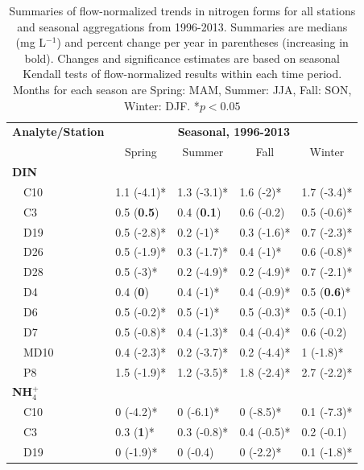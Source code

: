 \documentclass[letterpaper,12pt,oneside]{article}\usepackage[]{graphicx}\usepackage[]{color}
\begin{document}
\begin{table}[!tbp]
\caption{Summaries of flow-normalized trends in nitrogen forms for all stations and seasonal aggregations from 1996-2013. Summaries are  medians (mg L$^{-1}$) and percent change per year in parentheses (increasing in bold). Changes and significance estimates are based on seasonal Kendall tests of flow-normalized results within each time period. Months for each season are Spring: MAM, Summer: JJA, Fall: SON, Winter: DJF. *$p<0.05$\label{tab:trndsaft}} 
\begin{center}
\begin{tabular}{lllll}
\hline\hline
\multicolumn{1}{l}{\bfseries Analyte/Station}&\multicolumn{4}{c}{\bfseries Seasonal, 1996-2013}\tabularnewline
\cline{2-5}
\multicolumn{1}{l}{}&\multicolumn{1}{c}{Spring}&\multicolumn{1}{c}{Summer}&\multicolumn{1}{c}{Fall}&\multicolumn{1}{c}{Winter}\tabularnewline
\hline
{\bfseries DIN}&&&&\tabularnewline
~~C10&1.1 \footnotesize{(-4.1)*}&1.3 \footnotesize{(-3.1)*}&1.6 \footnotesize{(-2)*}&1.7 \footnotesize{(-3.4)*}\tabularnewline
~~C3&0.5 \footnotesize{(\textbf{0.5})}&0.4 \footnotesize{(\textbf{0.1})}&0.6 \footnotesize{(-0.2)}&0.5 \footnotesize{(-0.6)*}\tabularnewline
~~D19&0.5 \footnotesize{(-2.8)*}&0.2 \footnotesize{(-1)*}&0.3 \footnotesize{(-1.6)*}&0.7 \footnotesize{(-2.3)*}\tabularnewline
~~D26&0.5 \footnotesize{(-1.9)*}&0.3 \footnotesize{(-1.7)*}&0.4 \footnotesize{(-1)*}&0.6 \footnotesize{(-0.8)*}\tabularnewline
~~D28&0.5 \footnotesize{(-3)*}&0.2 \footnotesize{(-4.9)*}&0.2 \footnotesize{(-4.9)*}&0.7 \footnotesize{(-2.1)*}\tabularnewline
~~D4&0.4 \footnotesize{(\textbf{0})}&0.4 \footnotesize{(-1)*}&0.4 \footnotesize{(-0.9)*}&0.5 \footnotesize{(\textbf{0.6})*}\tabularnewline
~~D6&0.5 \footnotesize{(-0.2)*}&0.5 \footnotesize{(-1)*}&0.5 \footnotesize{(-0.3)*}&0.5 \footnotesize{(-0.1)}\tabularnewline
~~D7&0.5 \footnotesize{(-0.8)*}&0.4 \footnotesize{(-1.3)*}&0.4 \footnotesize{(-0.4)*}&0.6 \footnotesize{(-0.2)}\tabularnewline
~~MD10&0.4 \footnotesize{(-2.3)*}&0.2 \footnotesize{(-3.7)*}&0.2 \footnotesize{(-4.4)*}&1 \footnotesize{(-1.8)*}\tabularnewline
~~P8&1.5 \footnotesize{(-1.9)*}&1.2 \footnotesize{(-3.5)*}&1.8 \footnotesize{(-2.4)*}&2.7 \footnotesize{(-2.2)*}\tabularnewline
\hline
{\bfseries NH$_{4}^{+}$}&&&&\tabularnewline
~~C10&0 \footnotesize{(-4.2)*}&0 \footnotesize{(-6.1)*}&0 \footnotesize{(-8.5)*}&0.1 \footnotesize{(-7.3)*}\tabularnewline
~~C3&0.3 \footnotesize{(\textbf{1})*}&0.3 \footnotesize{(-0.8)*}&0.4 \footnotesize{(-0.5)*}&0.2 \footnotesize{(-0.1)}\tabularnewline
~~D19&0 \footnotesize{(-1.9)*}&0 \footnotesize{(-0.4)}&0 \footnotesize{(-2.2)*}&0.1 \footnotesize{(-1.8)*}\tabularnewline

\end{tabular}
\end{center}
\end{table}
\end{document}
